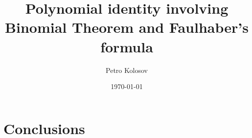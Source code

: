 \documentclass[12pt,letterpaper,oneside,reqno]{amsart}
\title[Polynomial identity involving Binomial Theorem and Faulhaber's formula]
{Polynomial identity involving Binomial Theorem and Faulhaber's formula}
\author[Petro Kolosov]{Petro Kolosov}
\date{\today}
\numberwithin{equation}{section}
\begin{document}
    \maketitle

    \tableofcontents


    \section{Conclusions}
    
%
%
%    
%
%
%    
%
%
%    
%
%
%    
%
%
%    
%
%
%    

%    


%    
%
%
%    
%
%
%    


%    
%
%    
%    
\end{document}
